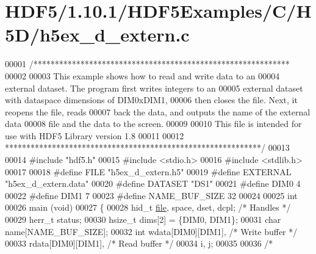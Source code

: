 \hypertarget{_h_d_f5_21_810_81_2_h_d_f5_examples_2_c_2_h5_d_2h5ex__d__extern_8c_source}{}\section{H\+D\+F5/1.10.1/\+H\+D\+F5\+Examples/\+C/\+H5\+D/h5ex\+\_\+d\+\_\+extern.c}
\label{_h_d_f5_21_810_81_2_h_d_f5_examples_2_c_2_h5_d_2h5ex__d__extern_8c_source}

\begin{DoxyCode}
00001 \textcolor{comment}{/************************************************************}
00002 \textcolor{comment}{}
00003 \textcolor{comment}{  This example shows how to read and write data to an}
00004 \textcolor{comment}{  external dataset.  The program first writes integers to an}
00005 \textcolor{comment}{  external dataset with dataspace dimensions of DIM0xDIM1,}
00006 \textcolor{comment}{  then closes the file.  Next, it reopens the file, reads}
00007 \textcolor{comment}{  back the data, and outputs the name of the external data}
00008 \textcolor{comment}{  file and the data to the screen.}
00009 \textcolor{comment}{}
00010 \textcolor{comment}{  This file is intended for use with HDF5 Library version 1.8}
00011 \textcolor{comment}{}
00012 \textcolor{comment}{ ************************************************************/}
00013 
00014 \textcolor{preprocessor}{#include "hdf5.h"}
00015 \textcolor{preprocessor}{#include <stdio.h>}
00016 \textcolor{preprocessor}{#include <stdlib.h>}
00017 
00018 \textcolor{preprocessor}{#define FILE            "h5ex\_d\_extern.h5"}
00019 \textcolor{preprocessor}{#define EXTERNAL        "h5ex\_d\_extern.data"}
00020 \textcolor{preprocessor}{#define DATASET         "DS1"}
00021 \textcolor{preprocessor}{#define DIM0            4}
00022 \textcolor{preprocessor}{#define DIM1            7}
00023 \textcolor{preprocessor}{#define NAME\_BUF\_SIZE   32}
00024 
00025 \textcolor{keywordtype}{int}
00026 main (\textcolor{keywordtype}{void})
00027 \{
00028     hid\_t       \hyperlink{structfile}{file}, space, dset, dcpl;    \textcolor{comment}{/* Handles */}
00029     herr\_t      status;
00030     hsize\_t     dims[2] = \{DIM0, DIM1\};
00031     \textcolor{keywordtype}{char}        name[NAME\_BUF\_SIZE];
00032     \textcolor{keywordtype}{int}         wdata[DIM0][DIM1],          \textcolor{comment}{/* Write buffer */}
00033                 rdata[DIM0][DIM1],          \textcolor{comment}{/* Read buffer */}
00034                 i, j;
00035 
00036     \textcolor{comment}{/*}

\end{DoxyCode}
